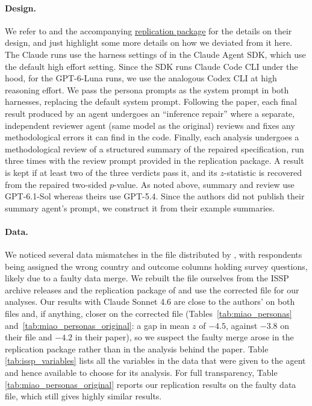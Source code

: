 \documentclass[10pt]{article}
\begin{document}
\paragraph{Design.} We refer to \citet{miao2026agentic} and the accompanying \href{https://github.com/jmiao24/AgenticBootstrap}{replication package} for the details on their design, and just highlight some more details on how we deviated from it here. The Claude runs use the harness settings of \citet{miao2026agentic} in the Claude Agent SDK, which use the default high effort setting. Since the SDK runs Claude Code CLI under the hood, for the GPT-6-Luna runs, we use the analogous Codex CLI at high reasoning effort. We pass the persona prompts as the system prompt in both harnesses, replacing the default system prompt. Following the paper, each final result produced by an agent undergoes an ``inference repair'' where a separate, independent reviewer agent (same model as the original) reviews and fixes any methodological errors it can find in the code. Finally, each analysis undergoes a methodological review of a structured summary of the repaired specification, run three times with the review prompt provided in the replication package. A result is kept if at least two of the three verdicts pass it, and its $z$-statistic is recovered from the repaired two-sided $p$-value. As noted above, summary and review use GPT-6.1-Sol whereas theirs use GPT-5.4. Since the authors did not publish their summary agent's prompt, we construct it from their example summaries.

\paragraph{Data.} We noticed several data mismatches in the file distributed by \citet{miao2026agentic}, with respondents being assigned the wrong country and outcome columns holding survey questions, likely due to a faulty data merge. We rebuilt the file ourselves from the ISSP archive releases and the replication package of \citet{breznau2022observing} and use the corrected file for our analyses. Our results with Claude Sonnet 4.6 are close to the authors' on both files and, if anything, closer on the corrected file (Tables~\ref{tab:miao_personas} and~\ref{tab:miao_personas_original}: a gap in mean $z$ of $-4.5$, against $-3.8$ on their file and $-4.2$ in their paper), so we suspect the faulty merge arose in the replication package rather than in the analysis behind the paper. Table \ref{tab:issp_variables} lists all the variables in the data that were given to the agent and hence available to choose for its analysis. For full transparency, Table \ref{tab:miao_personas_original} reports our replication results on the faulty data file, which still gives highly similar results.
\end{document}
